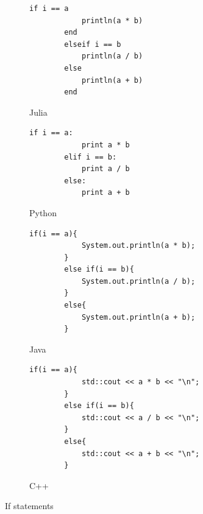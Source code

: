 \documentclass[a4paper, 11pt, titlepage]{article}
\begin{document}
\begin{figure}[H]
	\centering
	\begin{subfigure}[H]{0.7\textwidth}
		\centering
		\begin{lstlisting}[belowskip=0.5mm]
		if i == a
			println(a * b)
		end
		elseif i == b
			println(a / b)
		else
			println(a + b)
		end
		\end{lstlisting}
		\caption{Julia}
	\end{subfigure}
	\begin{subfigure}[H]{0.7\textwidth}
		\centering
		\begin{lstlisting}[belowskip=0.5mm]
		if i == a:
			print a * b
		elif i == b:
			print a / b
		else:
			print a + b
		\end{lstlisting}
		\caption{Python}
	\end{subfigure}	
	\begin{subfigure}[H]{0.7\textwidth}
		\centering
		\begin{lstlisting}[belowskip=0.5mm]
		if(i == a){
			System.out.println(a * b);
		}
		else if(i == b){
			System.out.println(a / b);
		}
		else{
			System.out.println(a + b);
		}
		\end{lstlisting}
		\caption{Java}
	\end{subfigure}
	\begin{subfigure}[H]{0.7\textwidth}
		\centering
		\begin{lstlisting}[belowskip=0.5mm]
		if(i == a){
			std::cout << a * b << "\n";
		}
		else if(i == b){
			std::cout << a / b << "\n";
		}
		else{
			std::cout << a + b << "\n";
		}
		\end{lstlisting}
		\caption{C++}
	\end{subfigure}
	\caption{If statements}
	\label{ifelse}
\end{figure}
\end{document}
